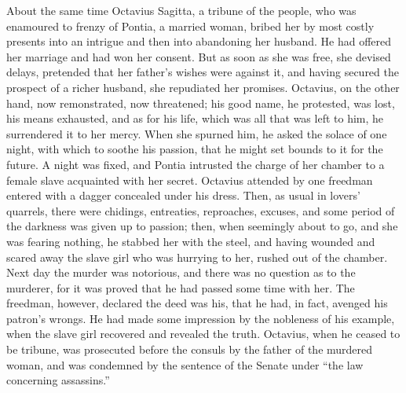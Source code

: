 About the same time Octavius Sagitta, a tribune of the people, who was enamoured to frenzy of Pontia, a married woman, bribed her by most costly presents into an intrigue and then into abandoning her husband. He had offered her marriage and had won her consent. But as soon as she was free, she devised delays, pretended that her father's wishes were against it, and having secured the prospect of a richer husband, she repudiated her promises. Octavius, on the other hand, now remonstrated, now threatened; his good name, he protested, was lost, his means exhausted, and as for his life, which was all that was left to him, he surrendered it to her mercy. When she spurned him, he asked the solace of one night, with which to soothe his passion, that he might set bounds to it for the future. A night was fixed, and Pontia intrusted the charge of her chamber to a female slave acquainted with her secret. Octavius attended by one freedman entered with a dagger concealed under his dress. Then, as usual in lovers' quarrels, there were chidings, entreaties, reproaches, excuses, and some period of the darkness was given up to passion; then, when seemingly about to go, and she was fearing nothing, he stabbed her with the steel, and having wounded and scared away the slave girl who was hurrying to her, rushed out of the chamber. Next day the murder was notorious, and there was no question as to the murderer, for it was proved that he had passed some time with her. The freedman, however, declared the deed was his, that he had, in fact, avenged his patron's wrongs. He had made some impression by the nobleness of his example, when the slave girl recovered and revealed the truth. Octavius, when he ceased to be tribune, was prosecuted before the consuls by the father of the murdered woman, and was condemned by the sentence of the Senate under ``the law concerning assassins.''


